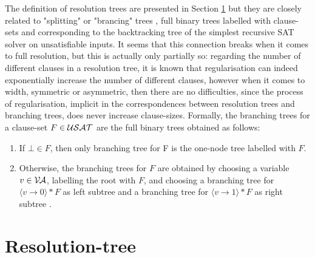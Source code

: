 \documentclass[12pt]{book}
\begin{document}
The definition of resolution trees are presented in Section \ref{sec:Resolution-tree} but they are closely related to "splitting" or "brancing" trees , full binary trees labelled with clause-sets and corresponding 
to the backtracking tree of the simplest recursive SAT solver on unsatisfiable inputs. It seems that this connection breaks when it comes 
to full resolution, but this is actually only partially so: regarding the number of different clauses in a resolution tree, it is known 
that regularisation can indeed exponentially increase the number of different clauses, however when it comes to width, symmetric or 
asymmetric, then there are no difficulties, since the process of regularisation, implicit in the correspondences between resolution
trees and branching trees, does never increase clause-sizes.
Formally, the branching trees for a clause-set $F \in \mathcal{USAT}$ are the full binary trees obtained as follows:
\begin{enumerate}
\item If $\bot \in F$, then only branching tree for F is the one-node tree labelled with $F$.
\item Otherwise, the branching trees for $F$ are obtained by choosing a variable $v \in \mathcal{V\hspace{-0.1em}A}$, labelling the root with $F$, and choosing 
a branching tree for $\langle v \rightarrow 0 \rangle * F$ as left subtree and a branching tree for $\langle v \rightarrow 1 \rangle * F$ as right subtree \cite{h5}.
\end{enumerate}

\section{Resolution-tree}
\label{sec:Resolution-tree}
\end{document}

